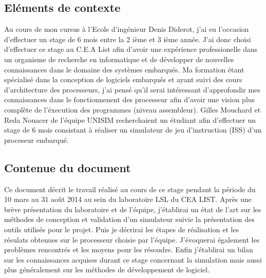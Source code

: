 \subsection {Eléments de contexte}
Au cours de mon cursus à l'Ecole d'ingénieur Denis Diderot, j'ai eu l'occasion d'effectuer un stage de 6 mois entre la 2 ième et 3 ième année. 
J'ai donc choisi d'effectuer ce stage au C.E.A List afin d'avoir une expérience professionelle dans un organisme de recherche en informatique et de développer de nouvelles connaissances dans le domaine des systèmes embarqués.
Ma formation étant spécialisé dans la conception de logiciels embarqués et ayant suivi des cours d'architecture des processeurs, 
j'ai pensé qu'il serai intéressant d'approfondir mes connaissances dans le fonctionnenent des processeur afin d'avoir une vision plus complète de l'éxecution des programmes (niveau assembleur).
Gilles Mouchard et Reda Nouacer de l'équipe UNISIM recherchaient un étudiant afin d'effectuer un stage de 6 mois consistant à réaliser un simulateur de jeu d'instruction (ISS) d'un proceseur embarqué. 
\subsection{Contenue du document}
Ce document décrit le travail réalisé au cours de ce stage pendant la période du 10 mars au 31 août 2014 au sein du laboratoire LSL du CEA LIST.
Après une brève présentation du laboratoire et de l'équipe, j'établirai un  état de l'art sur les méthodes de conception et validation d'un simulateur suivie la présentation des outils utilisés pour le projet.
Puis je décrirai les étapes de réalisation et les résulats obtenues sur le processeur choisie par l'équipe.
J'évoquerai également les problèmes rencontrés et les moyens pour les résoudre. 
Enfin j'établirai un bilan sur les connaissances acquises durant ce stage concernant la simulation mais aussi plus généralement sur les méthodes de développement de logiciel.      